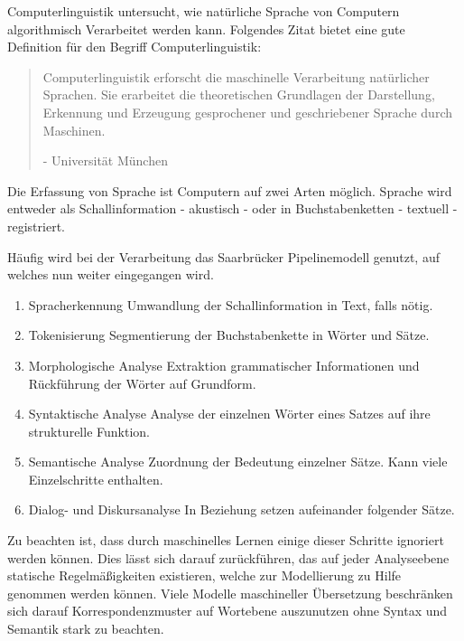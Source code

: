Computerlinguistik untersucht, wie natürliche Sprache von Computern algorithmisch Verarbeitet werden kann. Folgendes Zitat bietet eine gute Definition für den Begriff Computerlinguistik:

\begin{quotation}
	Computerlinguistik erforscht die maschinelle Verarbeitung natürlicher Sprachen. Sie erarbeitet die theoretischen Grundlagen der Darstellung, Erkennung und Erzeugung gesprochener und geschriebener Sprache durch Maschinen.
	
	- Universität München
\end{quotation}

Die Erfassung von Sprache ist Computern auf zwei Arten möglich. Sprache wird entweder als Schallinformation - akustisch - oder in Buchstabenketten - textuell - registriert.

Häufig wird bei der Verarbeitung das Saarbrücker Pipelinemodell genutzt, auf welches nun weiter eingegangen wird.

\newpage

\begin{enumerate}
	\item Spracherkennung \newline
	Umwandlung der Schallinformation in Text, falls nötig.
	\item Tokenisierung \newline
	Segmentierung der Buchstabenkette in Wörter und Sätze.
	\item Morphologische Analyse \newline
	Extraktion grammatischer Informationen und Rückführung der Wörter auf Grundform.
	\item Syntaktische Analyse \newline
	Analyse der einzelnen Wörter eines Satzes auf ihre strukturelle Funktion.
	\item Semantische Analyse \newline
	Zuordnung der Bedeutung einzelner Sätze. Kann viele Einzelschritte enthalten.
	\item Dialog- und Diskursanalyse \newline
	In Beziehung setzen aufeinander folgender Sätze.
\end{enumerate}

Zu beachten ist, dass durch maschinelles Lernen einige dieser Schritte ignoriert werden können. Dies lässt sich darauf zurückführen, das auf jeder Analyseebene statische Regelmäßigkeiten existieren, welche zur Modellierung zu Hilfe genommen werden können. Viele Modelle maschineller Übersetzung beschränken sich darauf Korrespondenzmuster auf Wortebene auszunutzen ohne Syntax und Semantik stark zu beachten. \newline


